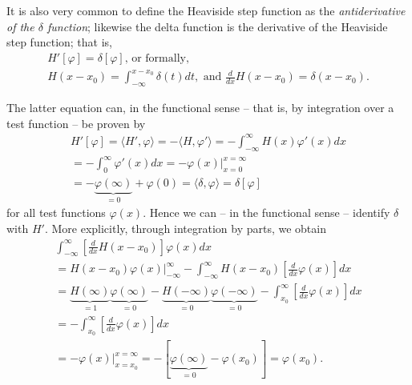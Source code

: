 It is also very common to define the  Heaviside step function as the
{\em antiderivative  of the $\delta$ function};
likewise the delta function is the derivative of the Heaviside step function; that is,
\begin{equation}
\begin{split}
H'[\varphi ]=\delta [\varphi ]\text{, or formally,}\\
H(x-x_0)
=
\int_{-\infty}^{x-x_0} \delta (t) dt,\text{ and }
\frac{d}{dx} H(x-x_0)=\delta (x-x_0).
\end{split}
\end{equation}

{\color{OliveGreen}
\bproof
The latter equation can, in the functional sense -- that is, by integration over a test function --
be proven by
\begin{equation}
\begin{split}
H'[\varphi ]= \langle   H' , \varphi   \rangle = - \langle  H ,  \varphi'   \rangle
 =
-\int_{-\infty}^\infty H(x) \varphi' (x)  dx \\
 =
-\int_{0}^\infty  \varphi' (x)  dx
  =
-\left.   \varphi  (x) \right|_{x=0}^{x= \infty} \\
  =
 -   \underbrace{\varphi  (\infty)}_{=0} +  \varphi  (0)
  =    \langle   \delta , \varphi  \rangle  =\delta [\varphi ]
\end{split}
\end{equation}
for all test functions $\varphi (x)$. Hence we can -- in the functional sense  -- identify $\delta$ with $H'$.
More explicitly, through integration by parts, we obtain
\begin{equation}
\begin{split}
\int _{-\infty}^\infty \left[\frac{d}{dx} H(x-x_0)\right] \varphi (x) dx       \\
  =
\left. H(x-x_0) \varphi (x)\right| _{-\infty}^\infty - \int _{-\infty}^\infty H(x-x_0) \left[\frac{d}{dx} \varphi (x)\right] dx \\
  =
\underbrace{H(\infty)}_{=1}\underbrace{\varphi(\infty)}_{=0} - \underbrace{H(-\infty)}_{=0}\underbrace{\varphi(-\infty)}_{=0}
   - \int _{x_0}^\infty \left[\frac{d}{dx} \varphi (x)\right] dx  \\
 =  - \int _{x_0}^\infty \left[\frac{d}{dx} \varphi (x)\right] dx \\
 =    -  \left.  \varphi (x)   \right| _{x=x_0}^{x= \infty}
 =    - [  \underbrace{\varphi  (\infty)}_{=0}  - \varphi (x_0)]
 =     \varphi (x_0).
\end{split}
\end{equation}



\eproof
}

